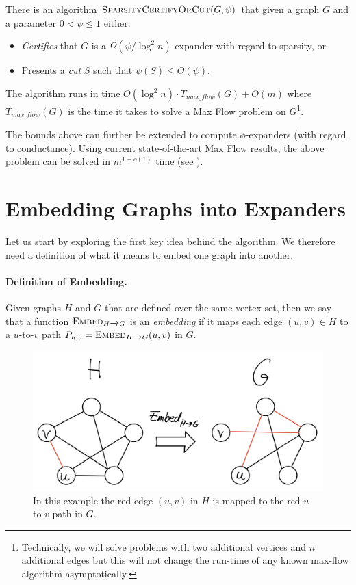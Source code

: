 \begin{theorem}
There is an algorithm $\textsc{SparsityCertifyOrCut}(G, \psi)$ that given a graph $G$ and a parameter $0 <\psi \leq 1$ either: 
\begin{itemize}
    \item \emph{Certifies} that $G$ is a $\Omega(\psi/\log^2 n)$-expander with regard to sparsity, or
    \item Presents a \emph{cut} $S$ such that $\psi(S) \leq O(\psi)$.
\end{itemize}
The algorithm runs in time $O(\log^2 n) \cdot T_{max\_flow}(G) + \tilde{O}(m)$ where $T_{max\_flow}(G)$ is the time it takes to solve a Max Flow problem on $G$\footnote{Technically, we will solve problems with two additional vertices and $n$ additional edges but this will not change the run-time of any known max-flow algorithm asymptotically.}.
\end{theorem}

The bounds above can further be extended to compute $\phi$-expanders (with regard to conductance). Using current state-of-the-art Max Flow results, the above problem can be solved in $m^{1+o(1)}$ time (see \cite{chen2022maximum}). 

\section{Embedding Graphs into Expanders}

Let us start by exploring the first key idea behind the algorithm. We therefore need a definition of what it means to embed one graph into another.

\paragraph{Definition of Embedding.} Given graphs $H$ and $G$ that are defined over the same vertex set, then we say that a function $\textsc{Embed}_{H \xrightarrow{} G}$ is an \emph{embedding} if it maps each edge $(u,v) \in H$ to a $u$-to-$v$ path $P_{u,v} = \textsc{Embed}_{H \xrightarrow{} G}(u,v)$ in $G$. 
\begin{figure}[!ht]
    \centering
    \includegraphics[scale=0.2]{./fig/embedGraph_lectureCutMatching.jpeg}
    \caption{In this example the red edge $(u,v)$ in $H$ is mapped to the red $u$-to-$v$ path in $G$.}
\end{figure}

